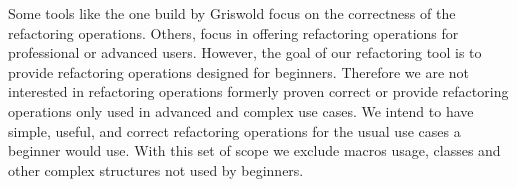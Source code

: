 Some tools like the one build by Griswold focus on the correctness of the refactoring
operations.
Others, focus in offering refactoring operations for professional or advanced users.
However, the goal of our refactoring tool is to provide refactoring operations
designed for beginners. %
Therefore we are not interested in refactoring operations formerly proven %
correct or provide refactoring operations only used in advanced and complex use cases. %
We intend to have simple, useful, and correct refactoring operations for the usual use cases a beginner would use.
With this set of scope we exclude macros usage, classes and other complex structures %
not used by beginners.

